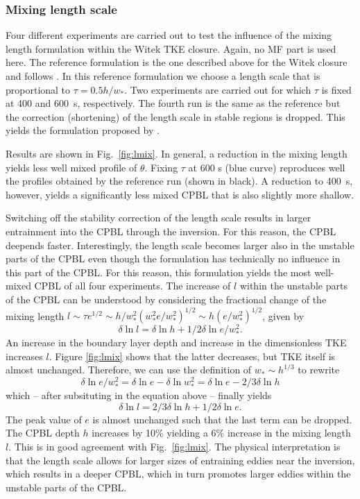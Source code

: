 \documentclass[dvipdfmx,a4paper,10pt]{article}
\begin{document}
\subsubsection{Mixing length scale}

Four different experiments are carried out to test the influence of the mixing length formulation within the Witek TKE closure. Again, no MF part is used here. The reference formulation is the one described above for the Witek closure and follows \cite{suselj13}. In this reference formulation we choose a length scale that is proportional to $\tau = 0.5 h/w_*$. Two experiments are carried out for which $\tau$ is fixed at 400 and 600~s, respectively. The fourth run is the same as the reference but the correction (shortening) of the length scale in stable regions is dropped. This yields the formulation proposed by \cite{teixeira04}. 

Results are shown in Fig.~\ref{fig:lmix}. In general, a reduction in the mixing length yields less well mixed profile of $\theta$. Fixing $\tau$ at 600 s (blue curve) reproduces well the profiles obtained by the reference run (shown in black). A reduction to 400~s, however, yields a significantly less mixed CPBL that is also slightly more shallow.  

Switching off the stability correction of the length scale results in larger entrainment into the CPBL through the inversion. For this reason, the CPBL deepends faster. Interestingly, the length scale becomes larger also in the unstable parts of the CPBL even though the formulation has technically no influence in this part of the CPBL. For this reason, this formulation yields the most well-mixed CPBL of all four experiments. The increase of $l$ within the unstable parts of the CPBL can be understood by considering the fractional change of the mixing length $l \sim \tau e^{1/2} \sim h/w_*^2 (w_*^2 e/w_*^2)^{1/2} \sim h (e/w_*^2)^{1/2}$, given by
\begin{equation}
 \delta \ln l = \delta \ln h + 1/2 \delta \ln e/w_*^2.
\end{equation}
An increase in the boundary layer depth and increase in the dimensionless TKE increases $l$. Figure \ref{fig:lmix} shows that the latter decreases, but TKE itself is almost unchanged. Therefore, we can use the definition of $w_*\sim h^{1/3}$ to rewrite
\begin{equation}
\delta \ln e/w_*^2 = \delta \ln e - \delta \ln w_*^2 = \delta \ln e - 2/3 \delta \ln h
\end{equation}
which -- after subsituting in the equation above -- finally yields
\begin{equation}
 \delta \ln l = 2/3 \delta \ln h + 1/2 \delta \ln e.
\end{equation}
The peak value of $e$ is almost unchanged such that the last term can be dropped. The CPBL depth $h$ increases by 10\% yielding a 6\% increase in the mixing length $l$. This is in good agreement with Fig.~\ref{fig:lmix}. The physical interpretation is that the \cite{teixeira04} length scale allows for larger sizes of entraining eddies near the inversion, which results in a deeper CPBL, which in turn promotes larger eddies within the unstable parts of the CPBL.   
\end{document}
